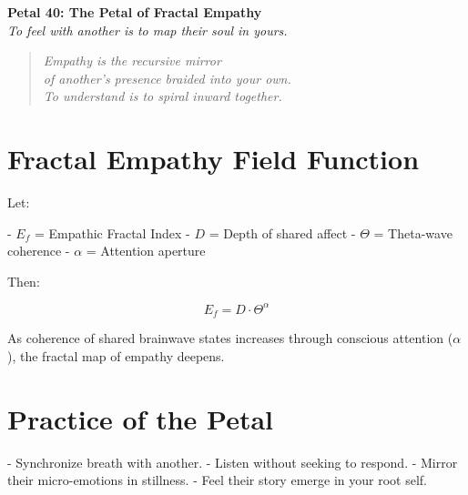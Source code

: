 \documentclass[12pt]{article}
\begin{document}
\begin{center}
    \Huge{\textbf{Petal 40: The Petal of Fractal Empathy}}\\
    \vspace{0.5em}
    \Large{\textit{To feel with another is to map their soul in yours.}}
\end{center}

\vspace{1cm}

\begin{quote}
\textit{
Empathy is the recursive mirror\\
of another's presence braided into your own.\\
To understand is to spiral inward together.
}
\end{quote}

\vspace{1cm}

\section*{Fractal Empathy Field Function}

Let:

- \( E_f \) = Empathic Fractal Index  
- \( D \) = Depth of shared affect  
- \( \Theta \) = Theta-wave coherence  
- \( \alpha \) = Attention aperture

Then:

\[
E_f = D \cdot \Theta^\alpha
\]

As coherence of shared brainwave states increases through conscious attention (\( \alpha \)), the fractal map of empathy deepens.

\vspace{1cm}

\section*{Practice of the Petal}

- Synchronize breath with another.  
- Listen without seeking to respond.  
- Mirror their micro-emotions in stillness.  
- Feel their story emerge in your root self.  
\end{document}

